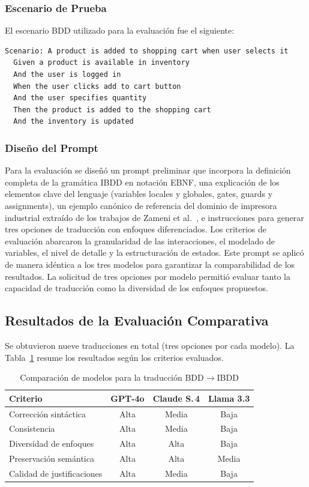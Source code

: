 \subsubsection{Escenario de Prueba}

El escenario BDD utilizado para la evaluación fue el siguiente:

\begin{lstlisting}
Scenario: A product is added to shopping cart when user selects it
  Given a product is available in inventory
  And the user is logged in
  When the user clicks add to cart button
  And the user specifies quantity
  Then the product is added to the shopping cart
  And the inventory is updated
\end{lstlisting}

\subsubsection{Diseño del Prompt}

Para la evaluación se diseñó un prompt preliminar que incorpora la definición completa de la gramática IBDD en notación EBNF, una explicación de los elementos clave del lenguaje (variables locales y globales, gates, guards y assignments), un ejemplo canónico de referencia del dominio de impresora industrial extraído de los trabajos de Zameni et al.~\cite{zameni2024ibdd}, e instrucciones para generar tres opciones de traducción con enfoques diferenciados. Los criterios de evaluación abarcaron la granularidad de las interacciones, el modelado de variables, el nivel de detalle y la estructuración de estados. Este prompt se aplicó de manera idéntica a los tres modelos para garantizar la comparabilidad de los resultados. La solicitud de tres opciones por modelo permitió evaluar tanto la capacidad de traducción como la diversidad de los enfoques propuestos.

\subsection{Resultados de la Evaluación Comparativa}

Se obtuvieron nueve traducciones en total (tres opciones por cada modelo). La Tabla~\ref{tab:comparacion_llms} resume los resultados según los criterios evaluados.

\begin{table}[htbp]
\centering
\caption{Comparación de modelos para la traducción BDD$\rightarrow$IBDD}
\label{tab:comparacion_llms}
\small
\begin{tabular}{lccc}
\hline
\textbf{Criterio} & \textbf{GPT-4o} & \textbf{Claude S.\,4} & \textbf{Llama 3.3} \\
\hline
Corrección sintáctica    & Alta  & Media & Baja  \\
Consistencia             & Alta  & Media & Baja  \\
Diversidad de enfoques   & Alta  & Alta  & Baja  \\
Preservación semántica   & Alta  & Alta  & Media \\
Calidad de justificaciones & Alta  & Media & Baja  \\
\hline
\end{tabular}
\end{table}

